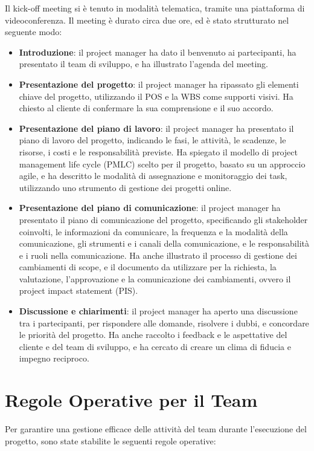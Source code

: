 Il kick-off meeting si è tenuto in modalità telematica, tramite una piattaforma di videoconferenza. Il meeting è durato circa due ore, ed è stato strutturato nel seguente modo:

\begin{itemize}
    \item \textbf{Introduzione}: il project manager ha dato il benvenuto ai partecipanti, ha presentato il team di sviluppo, e ha illustrato l'agenda del meeting.
    \item \textbf{Presentazione del progetto}: il project manager ha ripassato gli elementi chiave del progetto, utilizzando il POS e la WBS come supporti visivi. Ha chiesto al cliente di confermare la sua comprensione e il suo accordo.
    \item \textbf{Presentazione del piano di lavoro}: il project manager ha presentato il piano di lavoro del progetto, indicando le fasi, le attività, le scadenze, le risorse, i costi e le responsabilità previste. Ha spiegato il modello di project management life cycle (PMLC) scelto per il progetto, basato su un approccio agile, e ha descritto le modalità di assegnazione e monitoraggio dei task, utilizzando uno strumento di gestione dei progetti online.
    \item \textbf{Presentazione del piano di comunicazione}: il project manager ha presentato il piano di comunicazione del progetto, specificando gli stakeholder coinvolti, le informazioni da comunicare, la frequenza e la modalità della comunicazione, gli strumenti e i canali della comunicazione, e le responsabilità e i ruoli nella comunicazione. Ha anche illustrato il processo di gestione dei cambiamenti di scope, e il documento da utilizzare per la richiesta, la valutazione, l'approvazione e la comunicazione dei cambiamenti, ovvero il project impact statement (PIS).
    \item \textbf{Discussione e chiarimenti}: il project manager ha aperto una discussione tra i partecipanti, per rispondere alle domande, risolvere i dubbi, e concordare le priorità del progetto. Ha anche raccolto i feedback e le aspettative del cliente e del team di sviluppo, e ha cercato di creare un clima di fiducia e impegno reciproco.
\end{itemize}

\section{Regole Operative per il Team}
Per garantire una gestione efficace delle attività del team durante l'esecuzione del progetto, sono state stabilite le seguenti regole operative:

